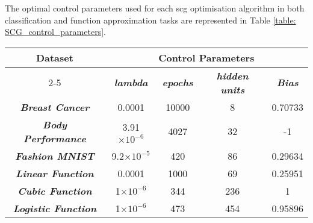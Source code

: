 \documentclass[10pt, conference]{IEEEtran}
\begin{document}
The optimal control parameters used for each \acrshort{scg} optimisation algorithm in both
classification and function approximation tasks are represented in Table
\ref{table: SCG_control_parameters}.
\begin{table*}[h!]
    \caption{Scaled Conjugate Gradient Control Parameters}
    \begin{center}
        \begin{tabular}{|c||c|c|c|c|}
            \hline
            \textbf{Dataset}&\multicolumn{4}{|c|}{\textbf{Control Parameters}} \\
            \cline{2-5}
                        & \textbf{\textit{lambda}} & \textbf{\textit{epochs}} & \textbf{\textit{hidden units}} & \textbf{\textit{Bias}}\\
            \hline
            \textbf{\textit{Breast Cancer}}  & 0.0001 & 10000 & 8 & 0.70733\\
            \textbf{\textit{Body Performance}}  & 3.91$\times10^{-6}$ & 4027 & 32 & -1\\
            \textbf{\textit{Fashion MNIST}} & 9.2$\times10^{-5}$ & 420 & 86 & 0.29634\\
            \textbf{\textit{Linear Function}} & 0.0001 & 1000 & 69 & 0.25951\\
            \textbf{\textit{Cubic Function}} & 1$\times10^{-6}$ & 344 & 236 & 1\\
            \textbf{\textit{Logistic Function}} & 1$\times10^{-6}$ & 473 & 454 & 0.95896\\
            \hline
        \end{tabular}
    \end{center}
    \label{table: SCG_control_parameters}
\end{table*}
\end{document}
